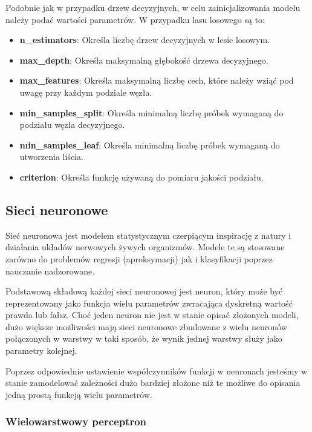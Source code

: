 \documentclass{article}
\begin{document}
Podobnie jak w przypadku drzew decyzyjnych, w celu
zainicjalizowania modelu należy podać wartości
parametrów. W przypadku lasu losowego są to:

\begin{itemize}
    \item \textbf{n\_estimators}: Określa liczbę drzew decyzyjnych
    w lesie losowym.
    \item \textbf{max\_depth}: Określa maksymalną głębokość drzewa
    decyzyjnego.
    \item \textbf{max\_features}: Określa maksymalną liczbę cech,
    które należy wziąć pod uwagę przy każdym podziale węzła.
    \item \textbf{min\_samples\_split}: Określa minimalną liczbę
    próbek wymaganą do podziału węzła decyzyjnego.
    \item \textbf{min\_samples\_leaf}: Określa minimalną liczbę
    próbek wymaganą do utworzenia liścia.
    \item \textbf{criterion}: Określa funkcję używaną do pomiaru
    jakości podziału.
\end{itemize}


\subsection{Sieci neuronowe}
Sieć neuronowa jest modelem statystycznym czerpiącym inspirację z natury i 
działania układów nerwowych żywych organizmów.
Modele te są stosowane zarówno do problemów regresji (aproksymacji) jak i klasyfikacji
poprzez nauczanie nadzorowane.

Podstawową składową każdej sieci neuronowej jest neuron, który może być reprezentowany 
jako funkcja wielu parametrów zwracająca dyskretną wartość
prawda lub fałsz. Choć jeden neuron nie jest w stanie opisać złożonych modeli, 
dużo większe możliwości mają sieci neuronowe zbudowane z wielu neuronów
połączonych w warstwy w taki sposób, że wynik jednej warstwy służy jako parametry kolejnej.


Poprzez odpowiednie ustawienie współczynników funkcji w neuronach jesteśmy w 
stanie zamodelować zależności dużo bardziej złożone niż te możliwe do opisania jedną
prostą funkcją wielu parametrów.

\subsubsection{Wielowarstwowy perceptron}
\end{document}
